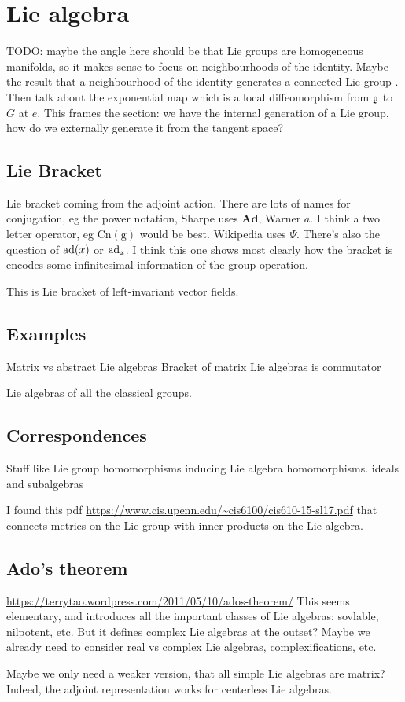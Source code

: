 \section{Lie algebra}

TODO: maybe the angle here should be that Lie groups are homogeneous manifolds, so it makes sense to focus on neighbourhoods of the identity.
Maybe the result that a neighbourhood of the identity generates a connected Lie group \cite[3.18]{Warner1983}.
Then talk about the exponential map which is a local diffeomorphism from $\mathfrak{g}$ to $G$ at $e$.
This frames the section: we have the internal generation of a Lie group, how do we externally generate it from the tangent space?

\subsection{Lie Bracket}
Lie bracket coming from the adjoint action.
There are lots of names for conjugation, eg the power notation, Sharpe uses $\mathbf{Ad}$, Warner $a$. I think a two letter operator, eg $\operatorname{Cn(g)}$ would be best. Wikipedia uses $\Psi$. There's also the question of $\operatorname{ad}(x)$ or $\operatorname{ad}_x$.
I think this one shows most clearly how the bracket is encodes some infinitesimal information of the group operation.

This is Lie bracket of left-invariant vector fields.


\subsection{Examples}
Matrix vs abstract Lie algebras
Bracket of matrix Lie algebras is commutator

Lie algebras of all the classical groups.


\subsection{Correspondences}

Stuff like Lie group homomorphisms inducing Lie algebra homomorphisms.
ideals and subalgebras

I found this pdf \url{https://www.cis.upenn.edu/~cis6100/cis610-15-sl17.pdf} that connects metrics on the Lie group with inner products on the Lie algebra.


\subsection{Ado's theorem}
\url{https://terrytao.wordpress.com/2011/05/10/ados-theorem/}
This seems elementary, and introduces all the important classes of Lie algebras: sovlable, nilpotent, etc. But it defines complex Lie algebras at the outset? Maybe we already need to consider real vs complex Lie algebras, complexifications, etc.

Maybe we only need a weaker version, that all simple Lie algebras are matrix?
Indeed, the adjoint representation works for centerless Lie algebras.

